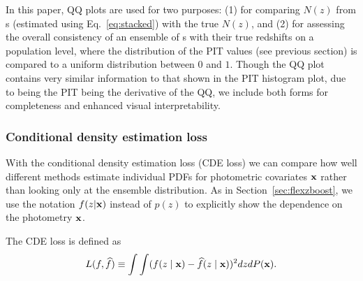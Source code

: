 In this paper, QQ plots are used for two purposes: (1) for comparing $N(z)$ from \pzpdf s (estimated using Eq.~\ref{eq:stacked}) with the true $N(z)$, and (2) for assessing the overall consistency of an ensemble of \pzpdf s with their true redshifts on a population level, where the distribution of the PIT values (see previous section) is compared to a uniform distribution between $0$ and $1$.
Though the QQ plot contains very similar information to that shown in the PIT histogram plot, due to being the PIT being the derivative of the QQ, we include both forms for completeness and enhanced visual interpretability. %

\subsubsection{Conditional density estimation loss}
\label{sec:CDE_loss}

With the conditional density estimation loss (CDE loss) we can compare how well different methods estimate individual PDFs for photometric covariates ${\mathbf{x}}$ rather than looking only at the ensemble distribution.
As in Section~\ref{sec:flexzboost}, we use the notation $f(z \vert {\mathbf{x}})$ instead of $p(z)$ to explicitly show the dependence on the photometry ${\mathbf{x}}$.


The CDE loss is defined as
\begin{equation} \label{eq:cde-loss}
L(f, \widehat{f}) \equiv \int \int (f(z \mid {\mathbf{x}}) - \widehat{f}(z \mid {\mathbf{x}}))^{2} dz dP({\mathbf{x}}) .
\end{equation}

